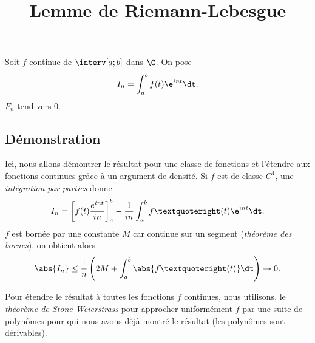 \documentclass[fontsize=12pt,twoside=false,parskip=half, french]{scrartcl}
\title{Lemme de Riemann-Lebesgue}
\date{}
\author{}
\begin{document}
\maketitle
   \begin{Theoreme}
      Soit $f$ continue de $\interv[a; b]$ dans $\C$. On pose
      \[
         I_n = \int_a^b f(t)\e^{int} \dt.
      \]
      $F_n$ tend vers 0.
   \end{Theoreme}
   \subsection{Démonstration}
      Ici, nous allons démontrer le résultat pour une classe de fonctions et l’étendre aux fonctions continues 
      grâce à un argument de densité. Si $f$ est de classe $C^1$, une \emph{intégration par parties} donne
      \[
         I_n = \left[f(t) \frac{e^{int}}{in}\right]_a^b - \frac{1}{in} \int_a^b f’(t)\e^{int} \dt.
      \]
      $f$ est bornée par une constante $M$ car continue sur un segment (\emph{théorème des bornes}), on obtient alors
      \[
         \abs{I_n} \leq \frac{1}{n} \left(2M + \int_a^b \abs{f’(t)} \dt\right) \to 0.
      \]
      
      Pour étendre le résultat à toutes les fonctions $f$ continues, nous utilisons, le
      \emph{théorème de Stone-Weierstrass} pour approcher uniformément $f$ par une suite de polynômes pour qui nous
      avons déjà montré le résultat (les polynômes sont dérivables).
\end{document}
